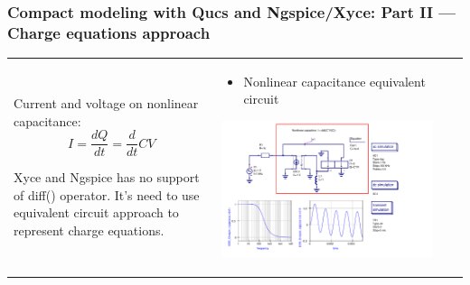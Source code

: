 \documentclass[9pt]{beamer}
\begin{document}
\begin{frame}
 \frametitle{Compact modeling with Qucs and Ngspice/Xyce: Part II --- Charge 
equations approach}

\hspace{-1cm}
  \begin{tabular}{p{}p{}}
  
  Current and voltage on nonlinear capacitance:
  \begin{equation}
   I = \frac{dQ}{dt} =\frac{d}{dt} C V
  \end{equation}
  
  Xyce and Ngspice has no support of diff() operator. It's need to use 
 equivalent circuit approach to represent charge equations.
 
   & 
\begin{itemize}
 \item Nonlinear capacitance equivalent circuit 
\end{itemize}

 
\includegraphics[width=0.9\textwidth]{img/Cap-equiv.pdf} \\
  \end{tabular}

 \end{frame}
 
\end{document}
